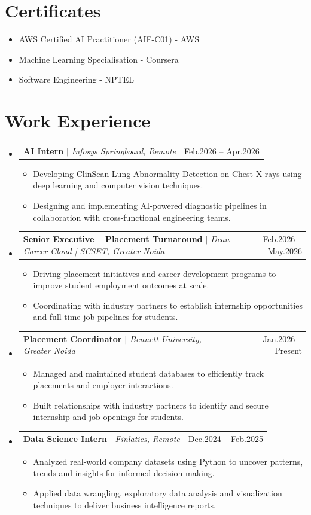 \documentclass[9.5pt,letterpaper]{article}
\makeatletter
\newcommand{\resumeItem}[1]{%
  \item\small{#1\vspace{-1pt}}%
}
\newenvironment{resumeList}{%
  \begin{itemize}[
    leftmargin=0.18in,
    label=\textbullet,
    itemsep=1pt,
    topsep=3pt,
    parsep=0pt
  ]%
}{%
  \end{itemize}\vspace{-2pt}%
}
\newenvironment{outerList}{%
  \begin{itemize}[leftmargin=0pt, label={}, itemsep=0pt, topsep=0pt, parsep=0pt]%
}{%
  \end{itemize}%
}
\newcommand{\workEntry}[3]{%
  \item[]
  \begin{tabularx}{\linewidth}{@{}X r@{}}
    \textbf{#1} \textit{\small $|$ #2} & \small #3
  \end{tabularx}\vspace{1pt}
}
\makeatother
\begin{document}
\vspace{2pt}
\section{Certificates}
\begin{resumeList}
  \resumeItem{AWS Certified AI Practitioner (AIF-C01) - AWS}
  \resumeItem{Machine Learning Specialisation - Coursera}
  \resumeItem{Software Engineering - NPTEL }
\end{resumeList}

\vspace{2pt}
\section{Work Experience}
\begin{outerList}
    
  \workEntry{AI Intern}{Infosys Springboard, Remote}{Feb.2026 – Apr.2026}
  \vspace{-15pt}
  \begin{resumeList}
    \resumeItem{Developing ClinScan Lung-Abnormality Detection on Chest X-rays using deep learning and computer vision techniques.}
    \resumeItem{Designing and implementing AI-powered diagnostic pipelines in collaboration with cross-functional engineering teams.}
  \end{resumeList}
\vspace{5pt}
  \workEntry{Senior Executive – Placement Turnaround}{Dean Career Cloud | SCSET, Greater Noida}{Feb.2026 – May.2026}
  \vspace{-15pt}
  \begin{resumeList}
    \resumeItem{Driving placement initiatives and career development programs to improve student employment outcomes at scale.}
    \resumeItem{Coordinating with industry partners to establish internship opportunities and full-time job pipelines for students.}
  \end{resumeList}
\vspace{5pt}
  \workEntry{Placement Coordinator}{Bennett University, Greater Noida}{Jan.2026 – Present}
  \vspace{-15pt}
  \begin{resumeList}
    \resumeItem{Managed and maintained student databases to efficiently track placements and employer interactions.}
    \resumeItem{Built relationships with industry partners to identify and secure internship and job openings for students.}
  \end{resumeList}
\vspace{5pt}
  \workEntry{Data Science Intern}{Finlatics, Remote}{Dec.2024 – Feb.2025}
  \begin{resumeList}
    \vspace{-5pt}
    \resumeItem{Analyzed real-world company datasets using Python to uncover patterns, trends and insights for informed decision-making.}
    \resumeItem{Applied data wrangling, exploratory data analysis and visualization techniques to deliver business intelligence reports.}
  \end{resumeList}

\end{outerList}
\end{document}
